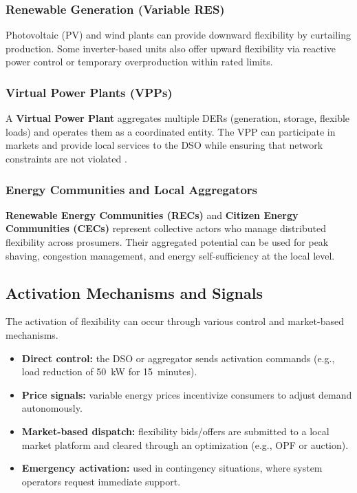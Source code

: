 \documentclass[11pt]{article}
\begin{document}
	\subsubsection*{Renewable Generation (Variable RES)}
	Photovoltaic (PV) and wind plants can provide downward flexibility by curtailing production.  
	Some inverter-based units also offer upward flexibility via reactive power control or temporary overproduction within rated limits.
	
	\subsubsection*{Virtual Power Plants (VPPs)}
	A \textbf{Virtual Power Plant} aggregates multiple DERs (generation, storage, flexible loads) and operates them as a coordinated entity.  
	The VPP can participate in markets and provide local services to the DSO while ensuring that network constraints are not violated \cite{mohandes2021vpp}.
	
	\subsubsection*{Energy Communities and Local Aggregators}
	\textbf{Renewable Energy Communities (RECs)} and \textbf{Citizen Energy Communities (CECs)} represent collective actors who manage distributed flexibility across prosumers.  
	Their aggregated potential can be used for peak shaving, congestion management, and energy self-sufficiency at the local level.
	
	\subsection{Activation Mechanisms and Signals}
	
	The activation of flexibility can occur through various control and market-based mechanisms.
	
	\begin{itemize}
		\item \textbf{Direct control:} the DSO or aggregator sends activation commands (e.g., load reduction of 50~kW for 15~minutes).
		\item \textbf{Price signals:} variable energy prices incentivize consumers to adjust demand autonomously.
		\item \textbf{Market-based dispatch:} flexibility bids/offers are submitted to a local market platform and cleared through an optimization (e.g., OPF or auction).
		\item \textbf{Emergency activation:} used in contingency situations, where system operators request immediate support.
	\end{itemize}
	
\end{document}
